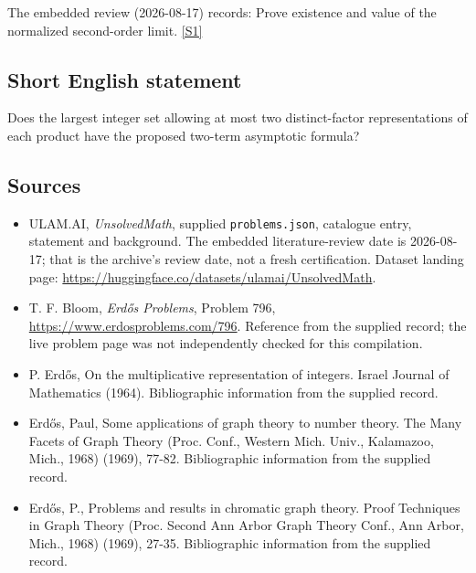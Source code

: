 \documentclass[11pt,a4paper]{article}
\newcommand{\sref}[2]{\hyperlink{source:#1:#2}{[S#2]}}
\begin{document}
The embedded review (2026-08-17) records: Prove existence and value of the normalized second-order limit. \sref{statement}{1}

\subsection{Short English statement}

Does the largest integer set allowing at most two distinct-factor representations of each product have the proposed two-term asymptotic formula?

\subsection{Sources}

{\small

\begin{itemize}

\item[\hypertarget{source:statement:1}{S1}] ULAM.AI, \emph{UnsolvedMath}, supplied \texttt{problems.json}, catalogue entry, statement and background. The embedded literature-review date is 2026-08-17; that is the archive’s review date, not a fresh certification. Dataset landing page: \url{https://huggingface.co/datasets/ulamai/UnsolvedMath}.

\item[\hypertarget{source:statement:2}{S2}] T. F. Bloom, \emph{Erdős Problems}, Problem 796, \url{https://www.erdosproblems.com/796}. Reference from the supplied record; the live problem page was not independently checked for this compilation.

\item[\hypertarget{source:statement:3}{S3}] P. Erd\H{o}s, On the multiplicative representation of integers. Israel Journal of Mathematics (1964). Bibliographic information from the supplied record.

\item[\hypertarget{source:statement:4}{S4}] Erd\H{o}s, Paul, Some applications of graph theory to number theory. The Many Facets of Graph Theory (Proc. Conf., Western Mich. Univ., Kalamazoo, Mich., 1968) (1969), 77-82. Bibliographic information from the supplied record.

\item[\hypertarget{source:statement:5}{S5}] Erd\H{o}s, P., Problems and results in chromatic graph theory. Proof Techniques in Graph Theory (Proc. Second Ann Arbor Graph Theory Conf., Ann Arbor, Mich., 1968) (1969), 27-35. Bibliographic information from the supplied record.

\end{itemize}

}

\label{end:statement}
\end{document}
